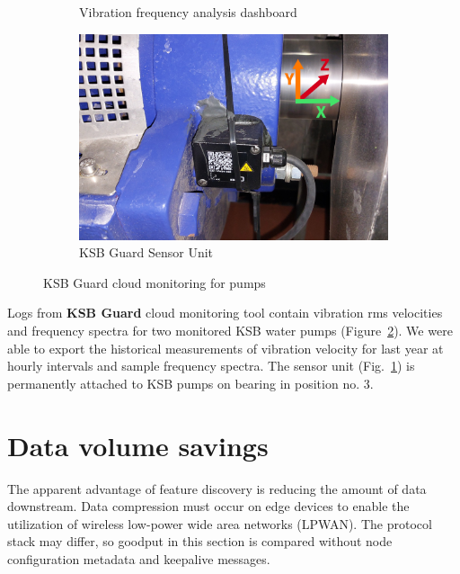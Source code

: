 \begin{figure}[h]
\begin{subfigure}[b]{0.49\textwidth}
        \caption{Vibration frequency analysis dashboard}
    \end{subfigure}
    \hfill
    \begin{subfigure}[b]{0.49\textwidth}
    		\centering
        \includegraphics[width=\textwidth]{assets/design/sensor/ksb-cloud.jpg}
        \caption{KSB Guard Sensor Unit}
        \label{fig:design:ksb-device}
    \end{subfigure}
     \caption{KSB Guard cloud monitoring for pumps}
     \label{fig:design:ksb-guard}
\end{figure}

Logs from \textbf{KSB Guard} cloud monitoring tool contain vibration rms velocities and frequency spectra for two monitored KSB water pumps (Figure~\ref{fig:design:ksb-guard}). We were able to export the historical measurements of vibration velocity for last year at hourly intervals and sample frequency spectra. The sensor unit (Fig.~\ref{fig:design:ksb-device}) is permanently attached to KSB pumps on bearing in position no. 3.

\section{Data volume savings}
The apparent advantage of feature discovery is reducing the amount of data downstream. Data compression must occur on edge devices to enable the utilization of wireless low-power wide area networks (LPWAN). The protocol stack may differ, so goodput in this section is compared without node configuration metadata and keepalive messages. 

